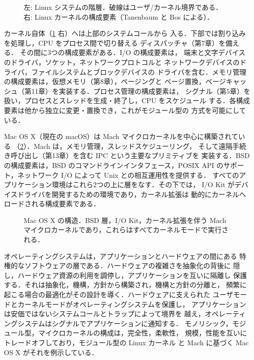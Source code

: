 \documentclass[../main.tex]{subfiles}
\begin{document}
\begin{figure}[htbp]
  \centering
  
  \caption{左: Linux システムの階層．破線はユーザ/カーネル境界である．
    右: Linux カーネルの構成要素（Tanenbaum と Bos \cite{tanenbaum2015}
    による）．}
  \label{fig:l01-linux}
\end{figure}

カーネル自体（\cref{fig:l01-linux} 右）へは上部のシステムコールから
入る．下部では割り込みを処理し，CPU をプロセス間で切り替える
ディスパッチャ（第7章）を備える．%
その間に3つの構成要素がある．I/O の構成要素は，
端末と文字デバイスのドライバ，ソケット，ネットワークプロトコルと
ネットワークデバイスのドライバ，ファイルシステムとブロックデバイスの
ドライバを含む．メモリ管理の構成要素は，仮想メモリ（第8章），ページングと
ページ置換，ページキャッシュ（第11章）を実装する．プロセス管理の構成要素は，
シグナル（第5章）を扱い，プロセスとスレッドを生成・終了し，CPU をスケジュール
する．各構成要素は他から独立に変更・置換でき，これがモジュール型の
方式を可能にしている．

Mac OS X（現在の macOS）は Mach マイクロカーネルを中心に構築されている
（\cref{fig:l01-macos}）．Mach は，メモリ管理，スレッドスケジューリング，
そして遠隔手続き呼び出し（第13章）を含む IPC という主要なプリミティブを
実装する．BSD の構成要素は，BSD のコマンドラインインタフェース，POSIX
API のサポート，ネットワーク I/O によって Unix との相互運用性を提供する．
すべてのアプリケーション環境はこれら2つの上に層をなす．その下では，
I/O Kit がデバイスドライバを開発するための環境であり，カーネル拡張は
動的にカーネルへロードされる構成要素である．

\begin{figure}[htbp]
  \centering
  
  \caption{Mac OS X の構造．BSD 層，I/O Kit，カーネル拡張を伴う Mach
    マイクロカーネルであり，これらはすべてカーネルモードで実行される．}
  \label{fig:l01-macos}
\end{figure}

\begin{keypoint}[章のまとめ]
  オペレーティングシステムは，アプリケーションとハードウェアの間にある
  特権的なソフトウェアの層である．ハードウェアの複雑さを抽象化の背後に
  隠し，ハードウェア資源の利用を調停し，アプリケーションを互いに隔離し
  保護する．それは抽象化，機構，方針から構築され，機構と方針の分離と，
  頻繁に起こる場合の最適化がその設計を導く．ハードウェアに支えられた
  ユーザモードとカーネルモードがオペレーティングシステムを保護し，
  アプリケーションは安価ではないシステムコールとトラップによって境界を
  越え，オペレーティングシステムはシグナルでアプリケーションに通知する．
  モノリシック，モジュール型，マイクロカーネルの構成は，完全性，柔軟性，
  規模，性能を互いにトレードオフしており，モジュール型の Linux カーネル
  と Mach に基づく Mac OS X がそれを例示している．
\end{keypoint}
\end{document}
